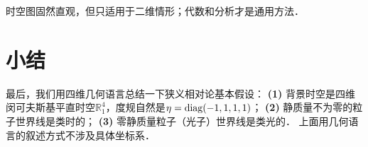 时空图固然直观，但只适用于二维情形；代数和分析才是通用方法．






\section*{小结}

最后，我们用四维几何语言总结一下狭义相对论基本假设：
{\bfseries (1)} 背景时空是四维闵可夫斯基平直时空$\mathbb{R}^4_1$，度规自然是$\eta={\rm diag}(-1,1,1,1)$；
{\bfseries (2)} 静质量不为零的粒子世界线是类时的；
{\bfseries (3)} 零静质量粒子（光子）世界线是类光的．
上面用几何语言的叙述方式不涉及具体坐标系．



\printbibliography[heading=subbibliography,title=第\ref{chsr}章参考文献]
\endinput
